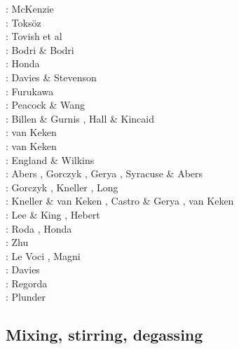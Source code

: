 \begin{scriptsize}
\nineteensixtynine: McKenzie \cite{mcke69}\\
\nineteenseventyone: Toks{\"o}z \etal \cite{tomj71}\\
\nineteenseventyeight: Tovish et al \cite{tosl78}\\
\nineteenseventynine: Bodri \& Bodri \cite{bobo79}\\
\nineteeneightyfive: Honda \cite{hond85}\\
\nineteenninetytwo: Davies \& Stevenson \cite{dast92}\\
\nineteenninetythree: Furukawa \cite{furu93}\\
\nineteenninetynine: Peacock \& Wang \cite{pewa99}\\
\twothousandone: Billen \& Gurnis \cite{bigu01}, Hall \& Kincaid \cite{haki01}\\
\twothousandtwo: van Keken \etal \cite{vakp02}\\
\twothousandthree: van Keken \cite{vank03}\\
\twothousandfour: England \& Wilkins \cite{enwi04}\\
\twothousandsix: Abers \etal \cite{abvk06}, Gorczyk \etal \cite{gogc06},
                 Gerya \etal \cite{gecy06}, Syracuse \& Abers \cite{syab06}\\
\twothousandseven: Gorczyk \etal \cite{gogc07}, Kneller \etal \cite{knvk07}, Long \etal \cite{lohd07}\\
\twothousandeight: Kneller \& van Keken \cite{knva08}, Castro \& Gerya \cite{cage08}, 
                   van Keken \etal \cite{vack08}\\
\twothousandnine: Lee \& King \cite{leki09}, Hebert \etal \cite{heaa09}\\
\twothousandten: Roda \etal \cite{roms10}, Honda \etal \cite{hogz10} \\
\twothousandeleven: Zhu \etal \cite{zhgh11}\\
\twothousandfourteen: Le Voci \etal \cite{ledg14}, Magni \etal \cite{mabv14}\\
\twothousandsixteen: Davies \etal \cite{dalg16} \\
\twothousandseventeen: Regorda \etal \cite{rerm17}\\
\twothousandeighteen: Plunder \etal \cite{pltv18}
\end{scriptsize}

\subsection{Mixing, stirring, degassing} 

